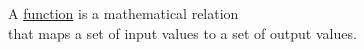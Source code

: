 \documentclass[preview]{standalone}
\begin{document}
\begin{center}
A \underline{function} is a mathematical relation \\ that maps a set of input values to a set of output values.
\end{center}
\end{document}
